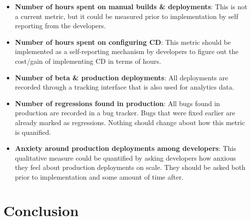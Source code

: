 \documentclass{ituthesis}
\begin{document}
\begin{itemize}
	\item \textbf{Number of hours spent on manual builds \& deployments}: This is not a current metric, but it could be measured prior to implementation by self reporting from the developers.
	\item \textbf{Number of hours spent on configuring CD}: This metric should be implemented as a self-reporting mechanism by developers to figure out the cost/gain of implementing CD in terms of hours.
	\item \textbf{Number of beta \& production deployments}: All deployments are recorded through a tracking interface that is also used for analytics data.
	\item \textbf{Number of regressions found in production}: All bugs found in production are recorded in a bug tracker. Bugs that were fixed earlier are already marked as regressions. Nothing should change about how this metric is quanified.
	\item \textbf{Anxiety around production deployments among developers}: This qualitative measure could be quantified by asking developers how anxious they feel about production deployments on scale. They should be asked both prior to implementation and some amount of time after.
\end{itemize}

\chapter{Conclusion}
\label{ch:conclusion}

\clearpage

\nocite{Humble2010}
\nocite{Bellomo2014}
\nocite{beck2001agile}

\end{document}
